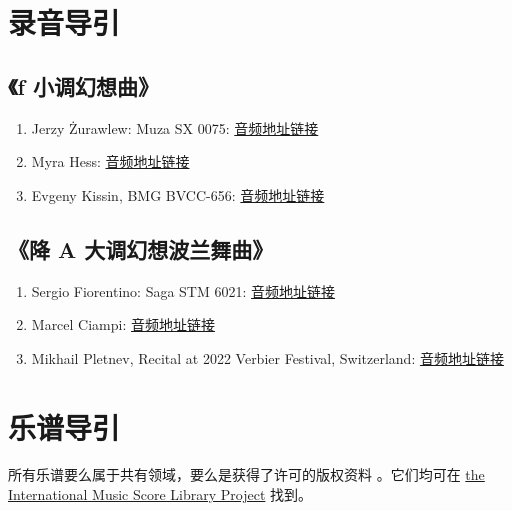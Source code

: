     \newpage
    \begin{appendices}
    \section{\heiti \fontsize{16}{19.2}\selectfont 录音导引}
    \subsection{\heiti \fontsize{15}{18}\selectfont 《f 小调幻想曲》}

    \begin{enumerate}
    \item Jerzy Żurawlew: Muza SX 0075: \href{https://xrdrsp.github.io/uploads/2023/05/01/Żurawlew-49.mp3}{音频地址链接}
    \item Myra Hess: \href{https://xrdrsp.github.io/uploads/2023/05/01/hess-49.mp3}{音频地址链接}
    \item Evgeny Kissin, BMG BVCC-656: \href{https://xrdrsp.github.io/uploads/2023/05/01/kissin-49.mp3}{音频地址链接}
    \end{enumerate}

    \subsection{\heiti \fontsize{15}{18}\selectfont 《降 A 大调幻想波兰舞曲》}

    \begin{enumerate}
    \item Sergio Fiorentino: Saga STM 6021: \href{https://xrdrsp.github.io/uploads/2023/05/01/fiorentino-61.mp3}{音频地址链接}
    \item Marcel Ciampi: \href{https://xrdrsp.github.io/uploads/2023/05/01/ciampi-61.mp3}{音频地址链接}
    \item Mikhail Pletnev, Recital at 2022 Verbier Festival, Switzerland: \href{https://xrdrsp.github.io/uploads/2023/05/01/pletnev-61.mp3}{音频地址链接}
    \end{enumerate}

    \section{\heiti \fontsize{16}{19.2}\selectfont 乐谱导引}
    所有乐谱要么属于共有领域，要么是获得了许可的版权资料 \cite{imslp}。它们均可在 \href{https://imslp.org}{the International Music Score Library Project} 找到。


\end{appendices}
